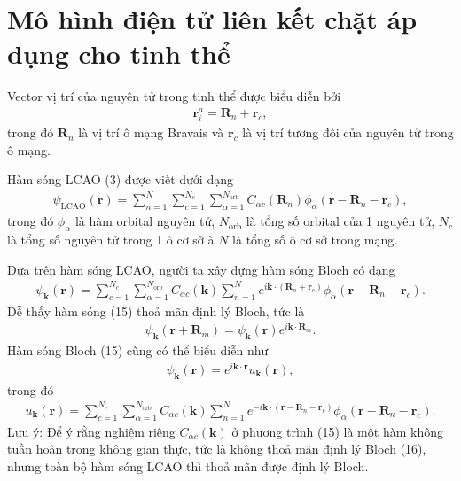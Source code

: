 \documentclass{article}
\begin{document}
\section{Mô hình điện tử liên kết chặt áp dụng cho tinh thể}
Vector vị trí của nguyên tử trong tinh thể được biểu diễn bởi
\begin{gather}
	\mathbf{r}_{i}^{a} = \mathbf{R}_{n} + \mathbf{r}_{c},
\end{gather}
trong đó $\mathbf{R}_{n}$ là vị trí ô mạng Bravais và $\mathbf{r}_{c}$ là vị trí tương đối của nguyên tử trong ô mạng.

Hàm sóng LCAO (3) được viết dưới dạng
\begin{gather}
	\psi_{\text{LCAO}}(\mathbf{r}) = \sum_{n=1}^{N} \sum_{c=1}^{N_{c}} \sum_{\alpha=1}^{N_{\text{orb}}} C_{\alpha c} (\mathbf{R}_{n}) \phi_{\alpha} (\mathbf{r} - \mathbf{R}_{n} - \mathbf{r}_{c}),
\end{gather}
trong đó $\phi_{\alpha}$ là hàm orbital nguyên tử, $N_{\text{orb}}$ là tổng số orbital của 1 nguyên tử, $N_{c}$ là tổng số nguyên tử trong 1 ô cơ sở à $N$ là tổng số ô cơ sở trong mạng.

Dựa trên hàm sóng LCAO, người ta xây dựng hàm sóng Bloch có dạng
\begin{gather}
	\psi_{\mathbf{k}}(\mathbf{r}) = \sum_{c=1}^{N_{c}} \sum_{\alpha=1}^{N_{\text{orb}}} C_{\alpha c} (\mathbf{k}) \sum_{n=1}^{N} e^{i \mathbf{k} \cdot (\mathbf{R}_{n} + \mathbf{r}_{c})} \phi_{\alpha} (\mathbf{r} - \mathbf{R}_{n} - \mathbf{r}_{c}).
\end{gather}
Dễ thấy hàm sóng (15) thoả mãn định lý Bloch, tức là
\begin{gather}
	\psi_{\mathbf{k}}(\mathbf{r} + \mathbf{R}_{m}) = \psi_{\mathbf{k}}(\mathbf{r}) e^{i \mathbf{k} \cdot \mathbf{R}_{m}}.
\end{gather}
Hàm sóng Bloch (15) cũng có thể biểu diễn như
\begin{gather}
	\psi_{\mathbf{k}}(\mathbf{r}) = e^{i \mathbf{k} \cdot \mathbf{r}} u_{\mathbf{k}} (\mathbf{r}),
\end{gather}
trong đó
\begin{gather}
	u_{\mathbf{k}}(\mathbf{r}) = \sum_{c=1}^{N_{c}} \sum_{\alpha=1}^{N_{\text{orb}}} C_{\alpha c} (\mathbf{k}) \sum_{n=1}^{N} e^{-i \mathbf{k} \cdot (\mathbf{r} - \mathbf{R}_{n} - \mathbf{r}_{c})} \phi_{\alpha} (\mathbf{r} - \mathbf{R}_{n} - \mathbf{r}_{c}).
\end{gather}
\underline{Lưu ý:} Để ý rằng nghiệm riêng $C_{\alpha c}(\mathbf{k})$ ở phương trình (15) là một hàm không tuần hoàn trong không gian thực, tức là không thoả mãn định lý Bloch (16), nhưng toàn bộ hàm sóng LCAO thì thoả mãn được định lý Bloch.
\end{document}
